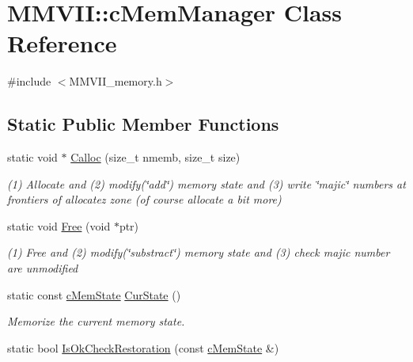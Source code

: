 \hypertarget{classMMVII_1_1cMemManager}{}\section{M\+M\+V\+II\+:\+:c\+Mem\+Manager Class Reference}
\label{classMMVII_1_1cMemManager}


{\ttfamily \#include $<$M\+M\+V\+I\+I\+\_\+memory.\+h$>$}

\subsection*{Static Public Member Functions}
\begin{DoxyCompactItemize}
\item 
static void $\ast$ \hyperlink{classMMVII_1_1cMemManager_ab3037196322cbc087cb88870d7021652}{Calloc} (size\+\_\+t nmemb, size\+\_\+t size)\hypertarget{classMMVII_1_1cMemManager_ab3037196322cbc087cb88870d7021652}{}\label{classMMVII_1_1cMemManager_ab3037196322cbc087cb88870d7021652}

\begin{DoxyCompactList}\small\item\em (1) Allocate and (2) modify(\char`\"{}add\char`\"{}) memory state and (3) write \char`\"{}majic\char`\"{} numbers at frontiers of allocatez zone (of course allocate a bit more) \end{DoxyCompactList}\item 
static void \hyperlink{classMMVII_1_1cMemManager_ae2d437a6eb397c0f617fb857fd4f9993}{Free} (void $\ast$ptr)\hypertarget{classMMVII_1_1cMemManager_ae2d437a6eb397c0f617fb857fd4f9993}{}\label{classMMVII_1_1cMemManager_ae2d437a6eb397c0f617fb857fd4f9993}

\begin{DoxyCompactList}\small\item\em (1) Free and (2) modify(\char`\"{}substract\char`\"{}) memory state and (3) check majic number are unmodified \end{DoxyCompactList}\item 
static const \hyperlink{classMMVII_1_1cMemState}{c\+Mem\+State} \hyperlink{classMMVII_1_1cMemManager_a10fec01028466ffbefe5f431a21e2c62}{Cur\+State} ()\hypertarget{classMMVII_1_1cMemManager_a10fec01028466ffbefe5f431a21e2c62}{}\label{classMMVII_1_1cMemManager_a10fec01028466ffbefe5f431a21e2c62}

\begin{DoxyCompactList}\small\item\em Memorize the current memory state. \end{DoxyCompactList}\item 
static bool \hyperlink{classMMVII_1_1cMemManager_a128d41c28ccf90cfa74d3fa7750ddb6d}{Is\+Ok\+Check\+Restoration} (const \hyperlink{classMMVII_1_1cMemState}{c\+Mem\+State} \&)\hypertarget{classMMVII_1_1cMemManager_a128d41c28ccf90cfa74d3fa7750ddb6d}{}\label{classMMVII_1_1cMemManager_a128d41c28ccf90cfa74d3fa7750ddb6d}


\end{DoxyCompactItemize}
